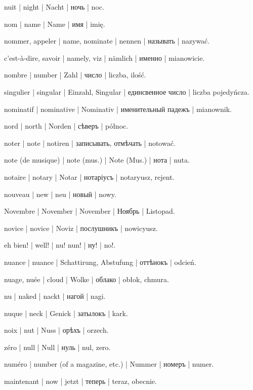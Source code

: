 \begin{outdent}{1em}
nuit | night | Nacht | ночь | noc.

nom | name | Name | имя | imię.

\uvsubentry{}
nommer, appeler | name, nominate | nennen | называть | nazywać.


\uvsubentry{}
c’est-à-dire, savoir | namely, viz | nämlich | именно | mianowicie.

nombre | number | Zahl | число | liczba, ilość.

\uvsubentry{}
singulier | singular | Einzahl, Singular | единсвенное число | liczba pojedyńcza.

nominatif | nominative | Nominativ | именительный падежъ | mianownik.

nord | north | Norden | сѣверъ | północ.

noter | note | notiren | записывать, отмѣчать | notować.

\uvsubentry{}
note (de musique) | note (mus.) | Note (Mus.) | нота | nuta.

notaire | notary | Notar | нотаріусъ | notaryusz, rejent.

nouveau | new | neu | новый | nowy.

Novembre | November | November | Ноябрь | Listopad.

novice | novice | Noviz | послушникъ | nowicyusz.

eh bien! | well! | nu! nun! | ну! | no!.

nuance | nuance | Schattirung, Abstufung | оттѣнокъ | odcień.

nuage, nuée | cloud | Wolke | облако | obłok, chmura.

nu | naked | nackt | нагой | nagi.

nuque | neck | Genick | затылокъ | kark.

noix | nut | Nuss | орѣхъ | orzech.

zéro | null | Null | нуль | nul, zero.

numéro | number (of a magazine, etc.) | Nummer | номеръ | numer.

maintenant | now | jetzt | теперь | teraz, obecnie.


\end{outdent}

